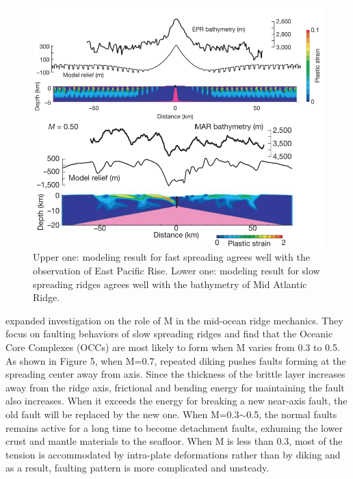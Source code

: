 \documentclass[12pt]{article}
\begin{document}
\begin{figure}[H]
 \centering
  \includegraphics[scale=0.7]{fig5_1.png}
 \caption{\small{Upper one: modeling result for fast spreading agrees well with the observation of East Pacific Rise. Lower one: modeling result for slow spreading ridges agrees well with the bathymetry of Mid Atlantic Ridge. \citep{Buck2005}}}
 \label{fig5_1}
\end{figure}
\citet{Tucholke2008} expanded investigation on the role of M in the mid-ocean ridge mechanics. They focus on faulting behaviors of slow spreading ridges and find that the Oceanic Core Complexes (OCCs) are most likely to form when M varies from 0.3 to 0.5. As shown in Figure 5, when M=0.7, repeated diking pushes faults forming at the spreading center away from axis. Since the thickness of the brittle layer increases away from the ridge axis, frictional and bending energy for maintaining the fault also increases. When it exceeds the energy for breaking a new near-axis fault, the old fault will be replaced by the new one. When M=0.3$\sim$0.5, the normal faults remains active for a long time to become detachment faults, exhuming the lower crust and mantle materials to the seafloor. When M is less than 0.3, most of the tension is accommodated by intra-plate deformations rather than by diking and as a result, faulting pattern is more complicated and unsteady.
\end{document}
